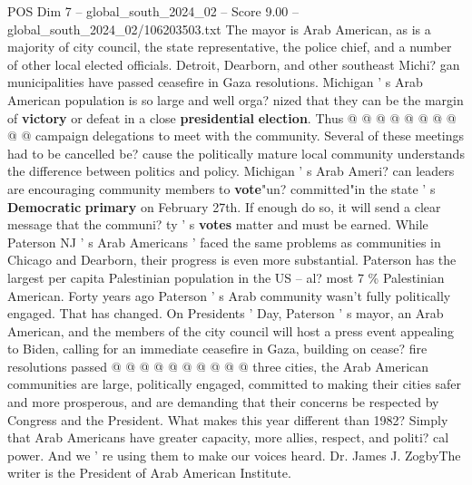 \begin{textsample}{POS Dim 7 – global\_south\_2024\_02 – Score 9.00 – global\_south\_2024\_02/106203503.txt}
The mayor is Arab American, as is a majority of city council, the state representative, the police chief, and a number of other local elected officials.
Detroit, Dearborn, and other southeast Michi? gan municipalities have passed ceasefire in Gaza resolutions.
Michigan ' s Arab American population is so large and well orga? nized that they can be the margin of \textbf{victory} or defeat in a close \textbf{presidential} \textbf{election}.
Thus @ @ @ @ @ @ @ @ @ @ campaign delegations to meet with the community.
Several of these meetings had to be cancelled be? cause the politically mature local community understands the difference between politics and policy.
Michigan ' s Arab Ameri? can leaders are encouraging community members to \textbf{vote}"un? committed"in the state ' s \textbf{Democratic} \textbf{primary} on February 27th.
If enough do so, it will send a clear message that the communi? ty ' s \textbf{votes} matter and must be earned.
While Paterson NJ ' s Arab Americans ' faced the same problems as communities in Chicago and Dearborn, their progress is even more substantial.
Paterson has the largest per capita Palestinian population in the US -- al? most 7 \% Palestinian American.
Forty years ago Paterson ' s Arab community wasn't fully politically engaged.
That has changed.
On Presidents ' Day, Paterson ' s mayor, an Arab American, and the members of the city council will host a press event appealing to Biden, calling for an immediate ceasefire in Gaza, building on cease? fire resolutions passed @ @ @ @ @ @ @ @ @ @ three cities, the Arab American communities are large, politically engaged, committed to making their cities safer and more prosperous, and are demanding that their concerns be respected by Congress and the President.
What makes this year different than 1982?
Simply that Arab Americans have greater capacity, more allies, respect, and politi? cal power.
And we ' re using them to make our voices heard.
Dr.
James J.
ZogbyThe writer is the President of Arab American Institute.

\end{textsample}
